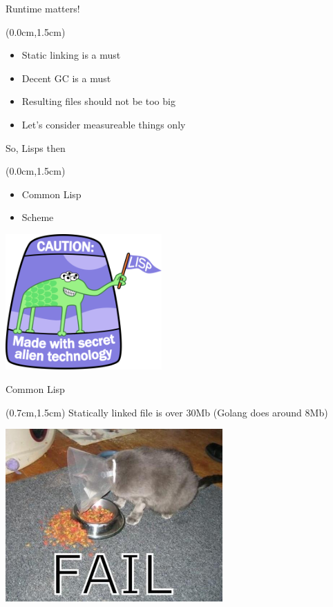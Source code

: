 \documentclass[xetex,14pt,aspectratio=169]{beamer}
\begin{document}
\begin{frame}{Runtime matters!}
\begin{textblock*}{\framewidth-0.8cm}(0.0cm,1.5cm) %
\begin{itemize}
  \item Static linking is a must
  \item Decent GC is a must
  \item Resulting files should not be too big
  \item Let's consider measureable things only
\end{itemize}
\end{textblock*}
\end{frame}

\begin{frame}{So, Lisps then}
\begin{textblock*}{\framewidth-0.8cm}(0.0cm,1.5cm) %
\begin{itemize}
  \item Common Lisp
  \item Scheme
\end{itemize}
\begin{minipage}{\textwidth}
  \centering
  \includegraphics[height=5.2cm]{img/lisplogo_256}
\end{minipage}
\end{textblock*}
\end{frame}

\begin{frame}{Common Lisp}
\begin{textblock*}{\framewidth-0.8cm}(0.7cm,1.5cm) %
Statically linked file is over 30Mb (Golang does around 8Mb)
\begin{minipage}{\textwidth}
  \centering
  \includegraphics[height=6.6cm]{img/fail1}
\end{minipage}
\end{textblock*}
\end{frame}
\end{document}
